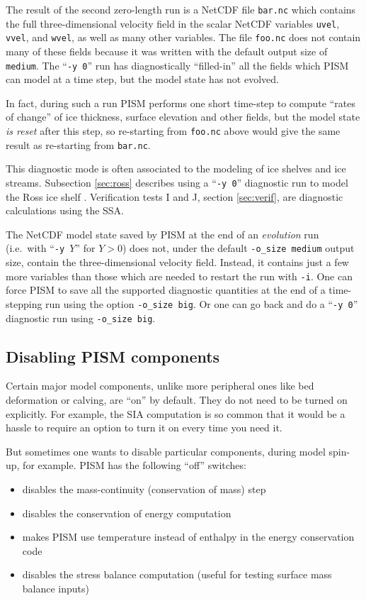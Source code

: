 \noindent The result of the second zero-length run is a NetCDF file \texttt{bar.nc} which contains the full three-dimensional velocity field in the scalar NetCDF variables \texttt{uvel}, \texttt{vvel}, and \texttt{wvel}, as well as many other variables.  The file \texttt{foo.nc} does not contain many of these fields because it was written with the default output size of \texttt{medium}.  The ``\texttt{-y 0}'' run has diagnostically ``filled-in'' all the fields which PISM can model at a time step, but the model state has not evolved.

In fact, during such a run PISM performs one short time-step to compute ``rates of change'' of ice thickness, surface elevation and other fields, but the model state \emph{is reset} after this step, so re-starting from \texttt{foo.nc} above would give the same result as re-starting from \texttt{bar.nc}.

This diagnostic mode is often associated to the modeling of ice shelves and ice streams.  Subsection \ref{sec:ross} describes using a ``\texttt{-y 0}'' diagnostic run to model the Ross ice shelf \cite{MacAyealetal}.  Verification tests I and J, section \ref{sec:verif}, are diagnostic calculations using the SSA.

The NetCDF model state saved by PISM at the end of an \emph{evolution} run (i.e.~with ``\texttt{-y }$Y$'' for $Y>0$) does not, under the default \texttt{-o_size medium} output size, contain the three-dimensional velocity field.  Instead, it contains just a few more variables than those which are needed to restart the run with \texttt{-i}.  One can  force PISM to save all the supported diagnostic quantities at the end of a time-stepping run using the option \texttt{-o_size big}.  Or one can go back and do a ``\texttt{-y 0}'' diagnostic run using \texttt{-o_size big}.


\subsection{Disabling PISM components}
\label{sec:turning-off}

Certain major model components, unlike more peripheral ones like bed deformation or calving, are ``on'' by default.  They do not need to be turned on explicitly.  For example, the SIA computation is so common that it would be a hassle to require an option to turn it on every time you need it.

But sometimes one wants to disable particular components, during model spin-up, for example.  PISM has the following ``off'' switches:
\begin{itemize}
\item {} disables the mass-continuity (conservation of mass) step
\item {} disables the conservation of energy computation
\item {} makes PISM use temperature instead of enthalpy in the energy conservation code
\item {} disables the stress balance computation (useful for testing surface mass balance inputs)
\end{itemize}


